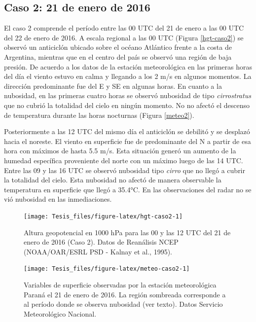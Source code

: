 \documentclass[12pt,spanish,oneside]{book}
\begin{document}
\subsection{Caso 2: 21 de enero de
2016}\label{caso-2-21-de-enero-de-2016}

El caso 2 comprende el período entre las 00 UTC del 21 de enero a las 00
UTC del 22 de enero de 2016. A escala regional a las 00 UTC (Figura
\ref{hgt-caso2}) se observó un anticiclón ubicado sobre el océano
Atlántico frente a la costa de Argentina, mientras que en el centro del
país se observó una región de baja presión. De acuerdo a los datos de la
estación meteorológica en las primeras horas del día el viento estuvo en
calma y llegando a los 2 m/s en algunos momentos. La dirección
predominante fue del E y SE en algunas horas. En cuanto a la nubosidad,
en las primeras cuatro horas se observó nubosidad de tipo
\emph{cirrostratus} que no cubrió la totalidad del cielo en ningún
momento. No no afectó el descenso de temperatura durante las horas
nocturnas (Figura \ref{meteo2}).

Posteriormente a las 12 UTC del mismo día el anticiclón se debilitó y se
desplazó hacia el noreste. El viento en superficie fue de predominante
del N a partir de esa hora con máximos de hasta 5.5 m/s. Esta situación
generó un aumento de la humedad específica proveniente del norte con un
máximo luego de las 14 UTC. Entre las 09 y las 16 UTC se observó
nubosidad tipo \emph{cirro} que no llegó a cubrir la totalidad del
cielo. Esta nubosidad no afectó de manera observable la temperatura en
superficie que llegó a 35.4°C. En las observaciones del radar no se vió
nubosidad en las inmediaciones.

\begin{figure}

{\centering \texttt{[image: Tesis\_files/figure-latex/hgt-caso2-1]} 

}

\caption{Altura geopotencial en 1000 hPa para las 00 y las 12 UTC del 21 de enero de 2016 (Caso 2). Datos de Reanálisis NCEP (NOAA/OAR/ESRL PSD - Kalnay et al., 1995). \label{hgt-caso2}}\label{fig:hgt-caso2}
\end{figure}

\begin{figure}

{\centering \texttt{[image: Tesis\_files/figure-latex/meteo-caso2-1]} 

}

\caption{Variables de superficie observadas por la estación meteorológica Paraná el 21 de enero de 2016. La región sombreada corresponde a al período donde se observa nubosidad (ver texto). Datos Servicio Meteorológico Nacional. \label{meteo2}}\label{fig:meteo-caso2}
\end{figure}
\end{document}
